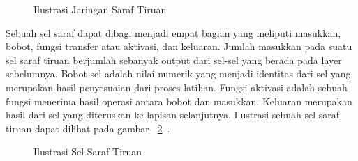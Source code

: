 \begin{figure}[htbp]
    \begin{center}
    \end{center}
    \vspace{-20pt}
    \captionsetup{labelfont=bf, textfont=bf}
    \caption{Ilustrasi Jaringan Saraf Tiruan}
    \vspace{-10pt}
    \captionsetup{labelfont=md, textfont=md}
    \label{fig:jaringansaraftiruan}
\end{figure}

Sebuah sel saraf dapat dibagi menjadi empat bagian yang meliputi masukkan, bobot, fungsi
transfer atau aktivasi, dan keluaran. Jumlah masukkan pada suatu sel saraf tiruan berjumlah sebanyak
output dari sel-sel yang berada pada layer sebelumnya. Bobot sel adalah nilai numerik yang menjadi
identitas dari sel yang merupakan hasil penyesuaian dari proses latihan. Fungsi aktivasi adalah
sebuah fungsi menerima hasil operasi antara bobot dan masukkan. Keluaran merupakan hasil dari sel
yang diteruskan ke lapisan selanjutnya. Ilustrasi sebuah sel saraf tiruan dapat dilihat pada gambar
~\ref{fig:saraftiruan}~\cite{Sharma2012ACS}.

\begin{figure}[htbp]
    \begin{center}
    \end{center}
    \vspace{-20pt}
    \captionsetup{labelfont=bf, textfont=bf}
    \caption{Ilustrasi Sel Saraf Tiruan}
    \vspace{-10pt}
    \captionsetup{labelfont=md, textfont=md}
    \label{fig:saraftiruan}
\end{figure}

